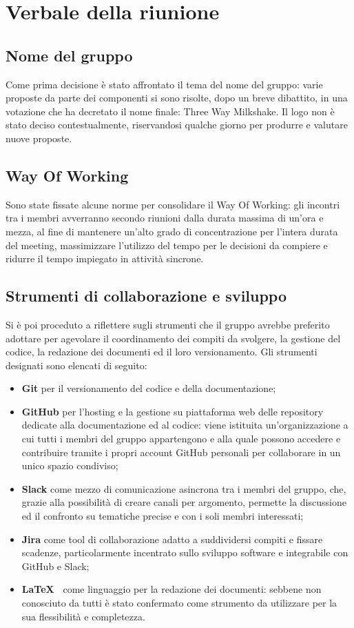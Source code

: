 \section{Verbale della riunione}
\subsection{Nome del gruppo}
Come prima decisione è stato affrontato il tema del nome del gruppo: varie proposte da parte dei componenti si sono risolte, dopo un breve dibattito, in una votazione che ha decretato il nome finale: Three Way Milkshake. Il logo non è stato deciso contestualmente, riservandosi qualche giorno per produrre e valutare nuove proposte.

\subsection{Way Of Working}
Sono state fissate alcune norme per consolidare il Way Of Working: gli incontri tra i membri avverranno secondo riunioni dalla durata massima di un'ora e mezza, al fine di mantenere un'alto grado di concentrazione per l'intera durata del meeting, massimizzare l'utilizzo del tempo per le decisioni da compiere e ridurre il tempo impiegato in attività sincrone.

\subsection{Strumenti di collaborazione e sviluppo}
Si è poi proceduto a riflettere sugli strumenti che il gruppo avrebbe preferito adottare per agevolare il coordinamento dei compiti da svolgere, la gestione del codice, la redazione dei documenti ed il loro versionamento.
Gli strumenti designati sono elencati di seguito:

\begin{itemize}
	\item \textbf{Git} per il versionamento del codice e della documentazione;
	\item \textbf{GitHub} per l'hosting e la gestione su piattaforma web delle repository dedicate alla documentazione ed al codice: viene istituita un'organizzazione a cui tutti i membri del gruppo appartengono e alla quale possono accedere e contribuire tramite i propri account GitHub personali per collaborare in un unico spazio condiviso;
	\item \textbf{Slack} come mezzo di comunicazione asincrona tra i membri del gruppo, che, grazie alla possibilità di creare canali per argomento, permette la discussione ed il confronto su tematiche precise e con i soli membri interessati;
	\item \textbf{Jira} come tool di collaborazione adatto a suddividersi compiti e fissare scadenze, particolarmente incentrato sullo sviluppo software  e integrabile con GitHub e Slack;
	\item \textbf{\LaTeX\ } come linguaggio per la redazione dei documenti: sebbene non conosciuto da tutti è stato confermato come strumento da utilizzare per la sua flessibilità e completezza.
\end{itemize}

